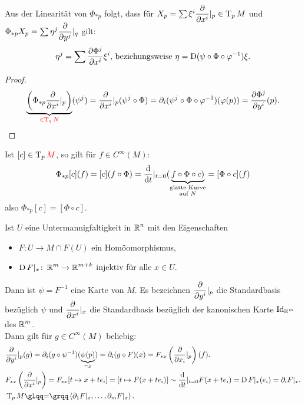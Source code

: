 \begin{bem}
  Aus der Linearität von $\Phi_{*p}$ folgt, dass für $X_p = \sum \xi^i\dfrac{\partial }{\partial x^i}|_p \in \operatorname{T}_pM$ und $\Phi_{*p}X_p = \sum \eta^j\dfrac{\partial }{\partial y^j}|_q$ gilt:
  \begin{align*}
    \eta^j = \sum \frac{\partial \Phi^j}{\partial x^i}\xi^i \text{, beziehungsweise } \eta = \operatorname{D}(\psi \circ \Phi \circ \varphi^{-1})\xi.
  \end{align*}
\end{bem}

\begin{proof}
  \begin{align*}
    \underbrace{\left(\Phi_{*p}\dfrac{\partial }{\partial x^i}|_p\right)}_{\textcolor{red}{\in \operatorname{T}_qN}}(\psi^j) = \dfrac{\partial }{\partial x^i}|_p(\psi^j \circ \Phi) = \partial_i (\psi^j \circ \Phi \circ \varphi^{-1})(\varphi(p)) = \frac{\partial \Phi^j}{\partial y^i}(p).
  \end{align*}
\end{proof}

\begin{bem}
  Ist $[c] \in \operatorname{T}_p\textcolor{red}{M}$, so gilt für $f \in C^{\infty}(M)$:
  \begin{align*}
    \Phi_{*p}[c](f) = [c](f \circ \Phi) = \dfrac{\mathrm{d} }{\mathrm{d} t}|_{t=0}(\underbrace{f \circ \Phi \circ c)}_{\substack{\text{glatte Kurve}\\ \text{auf }N}} = [\Phi \circ c](f)
  \end{align*}
  also $\Phi_{*p}[c] = [\Phi \circ c]$.
\end{bem}

\begin{bem}
  Ist $U$ eine Untermannigfaltigkeit in $\operatorname{\mathbb{R}}^n$ mit den Eigenschaften
  \begin{itemize}
  \item $F \colon U \to M \cap F(U)$ ein Homöomorphismus,
  \item $\operatorname{D} F|_x\colon \operatorname{\mathbb{R}}^m \to \operatorname{\mathbb{R}}^{m+k}$ injektiv für alle $x \in U$.
  \end{itemize}
  Dann ist $\psi = F^{-1}$ eine Karte von $M$. Es bezeichnen $\dfrac{\partial }{\partial y^i}|_p$ die Standardbasis bezüglich $\psi$ und $\dfrac{\partial }{\partial x^i}|_x$ die Standardbasis bezüglich der kanonischen Karte $\operatorname{Id}_{\operatorname{\mathbb{R}}^m}$ des $\operatorname{\mathbb{R}}^m$.\\
  Dann gilt für $g \in C^{\infty}(M)$ beliebig:
  \begin{align*}
    & \pdifffrac{y^i}|_p(g) = \partial_i(g \circ \psi^{-1})(\underbrace{\psi(p)}_{=x}) = \partial_i(g \circ F)(x) = F_{*x}\left(\pdifffrac{x_i}|_p\right)(f).\\
    & F_{*x}\left(\pdifffrac{x^i}|_p\right) = F_{*x}[t \mapsto x + te_i] = [t \mapsto F(x+te_i)] \sim \difffrac{t}|_{t=0}F(x+te_i) = \D F|_x(e_i) = \partial_iF|_x.\\
    & \T_pM \quot{=} \left<\partial_1F|_x, \ldots, \partial_m F|_x\right).
\end{align*}
\end{bem}

